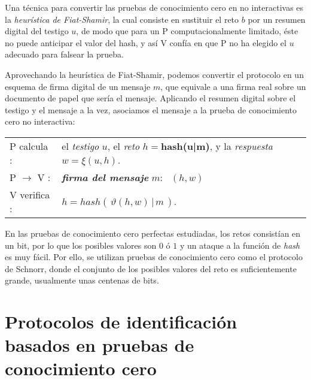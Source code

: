 Una técnica para convertir las pruebas de conocimiento cero en no interactivas es la \textit{heurística de Fiat-Shamir}, la cual consiste en sustituir el reto $b$ por un resumen digital del testigo $u$, de modo que para un P computacionalmente limitado, éste no puede anticipar el valor del hash, y así V confía en que P no ha elegido el $u$ adecuado para falsear la prueba.

\hfil

Aprovechando la heurística de Fiat-Shamir, podemos convertir el protocolo en un esquema de firma digital de un mensaje $m$, que equivale a una firma real sobre un documento de papel que sería el mensaje. Aplicando el resumen digital sobre el testigo y el mensaje a la vez, asociamos el mensaje a la prueba de conocimiento cero no interactiva:


\begin{center}
	\begin{tabular}{ll}\label{fiat-shamir-heur}
		P calcula :& el \textit{testigo} $u$, el \textit{reto} $h=$\textbf{hash(u|m)}, y la \textit{respuesta} $w = \xi(u, h)$.
		\\
		P $\rightarrow$ V :& \textit{\textbf{firma del mensaje}} $m$: \, $(h,w)$
		\\
		V verifica :& $h=hash(\,\vartheta(h,w)\,|\,m\,)$.
	\end{tabular}
\end{center}

\hfil


\begin{remark}
	\hfil
	
	En las pruebas de conocimiento cero perfectas estudiadas, los retos consistían en un bit, por lo que los posibles valores son $0$ ó $1$ y un ataque a la función de \textit{hash} es muy fácil. Por ello, se utilizan pruebas de conocimiento cero como el protocolo de Schnorr, donde el conjunto de los posibles valores del reto es suficientemente grande, usualmente unas centenas de bits.
\end{remark}








\section{Protocolos de identificación basados en pruebas de conocimiento cero}


